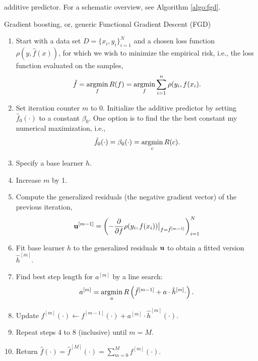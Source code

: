 additive predictor. For a schematic overview, see Algorithm \ref{algo:fgd}.
\begin{algorithm}
\caption{Gradient boosting, or, generic Functional Gradient Descent (FGD)}
\label{algo:fgd}
\begin{enumerate}
    \item Start with a data set $D=\{x_i, y_i\}_{i=1}^N$ and a chosen loss function $\rho(y,\hat{f}(x))$, for which we wish to
        minimize the empirical risk, i.e., the loss function evaluated on the samples,
        \begin{equation}
            \hat{f}=\operatorname*{argmin}_{f}R(f)=\operatorname*{argmin}_{f}\sum_{i=1}^n\rho(y_{i},f(x_{i}).
        \end{equation}
    \item Set iteration counter $m$ to 0. Initialize the additive predictor by setting $\hat{f}_0(\cdot)$ to a constant $\beta_0$. One option is to find the the best constant my numerical maximization, i.e.,
        \begin{equation}
            \hat{f}_0(\cdot)=\beta_0(\cdot)=\operatorname*{argmin}_c R(c).
        \end{equation}
    \item Specify a base learner $h$.
    \item Increase $m$ by 1.
    \item Compute the generalized residuals (the negative gradient vector) of the previous iteration,
        \begin{equation}
            \mathbf{u}^{[m-1]}=\left(-\frac{\partial}{\partial f}\rho(y_i, f(x_i))\big\rvert_{f=\hat{f}^{[m-1]}}\right)_{i=1}^N
        \end{equation}
    \item Fit base learner $h$ to the generalized residuals $\mathbf{u}$ to obtain a fitted version $\hat{h}^{[m]}$.
    \item Find best step length for $a^{[m]}$ by a line search:
        \begin{equation*}
            a^{[m]}=\operatorname*{argmin}_{a}R\left(\hat{f}^{[m-1]}+a\cdot\hat{h}^{[m]}{\cdot}\right).
        \end{equation*}
    \item Update $f^{[m]}(\cdot)\gets f^{[m-1]}(\cdot)+a^{[m]}\cdot \hat{h}^{[m]}(\cdot)$.
    \item Repeat steps 4 to 8 (inclusive) until $m=M$.
    \item Return $\hat{f}(\cdot)=\hat{f}^{[M]}(\cdot)=\sum_{m=0}^{M}f^{[m]}(\cdot)$.
\end{enumerate}
\end{algorithm}

